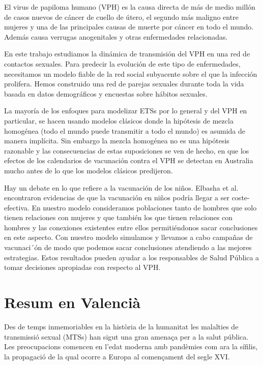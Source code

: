 El virus de papiloma humano (VPH) es la causa directa de m\'as de medio mill\'on de casos nuevos de c\'ancer de cuello de \'utero, el segundo m\'as maligno entre mujeres y una de las principales causas de muerte por c\'ancer en todo el mundo. Adem\'as causa verrugas anogenitales y otras enfermedades relacionadas.

En este trabajo estudiamos la din\'amica de transmisi\'on del VPH en una red de contactos sexuales. Para predecir la evoluci\'on de este tipo de enfermedades, necesitamos un modelo fiable de la red social subyacente sobre el que la infecci\'on prolifera. Hemos construido una red de parejas sexuales durante toda la vida basada en datos demogr\'aficos y encuestas sobre h\'abitos sexuales.

La mayor\'ia de los enfoques para modelizar ETSs por lo general y del VPH en particular, se hacen usando modelos cl\'asicos donde la hip\'otesis de mezcla homog\'enea (todo el mundo puede transmitir a todo el mundo) es asumida de manera impl\'icita. Sin embargo la mezcla homog\'enea no es una hip\'otesis razonable y las consecuencias de estas suposiciones se ven de hecho, en que los efectos de los calendarios de vacunaci\'on contra el VPH se detectan en Australia mucho antes de lo que los modelos cl\'asicos predijeron.

Hay un debate en lo que refiere a la vacunaci\'on de los ni\~nos. Elbasha et al. encontraron evidencias de que la vacunaci\'on en ni\~nos podr\'ia llegar a ser coste-efectiva. En nuestro modelo consideramos poblaciones tanto de hombres que solo tienen relaciones con mujeres y que tambi\'en los que tienen relaciones con hombres y las conexiones existentes entre ellos permiti\'endonos sacar conclusiones en este aspecto. Con nuestro modelo simulamos y llevamos a cabo campa\~nas de vacunaci´\'on de modo que podemos sacar conclusiones atendiendo a las mejores estrategias. Estos resultados pueden ayudar a los responsables de Salud P\'ublica a tomar decisiones apropiadas con respecto al VPH.

\chapter*{Resum en Valenci\`a}
Des de temps inmemoriables en la hist\`oria de la humanitat les malalties de transmissi\'o sexual (MTSs) han sigut una gran amena\c{c}a per a la salut p\'ublica. Les preocupacions comencen en l'edat moderna amb pand\`emies com ara la s\'ifilis, la propagaci\'o de la qual ocorre a Europa al comen\c{c}ament del segle XVI. 

